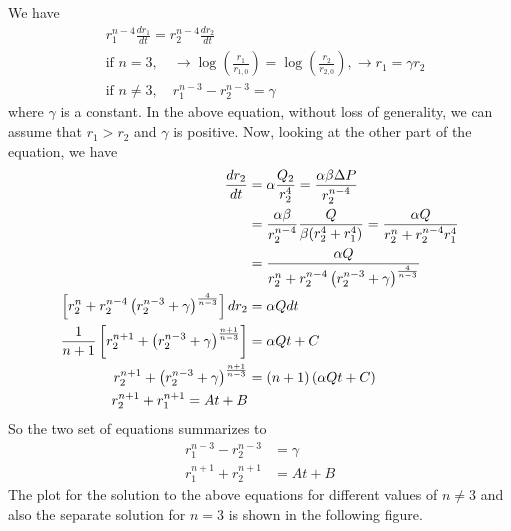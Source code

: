 We have
%
\begin{align}
  &r_{1}^{n-4} \frac{dr_{1}}{dt} = r_2^{n-4}\frac{dr_{2}}{dt}\\
  &\text{if }n=3, \quad \to \log(\frac{r_{1}}{r_{1,0}}) = \log(\frac{r_{2}}{r_{2,0}}), \to r_1 = \gamma r_2 \\
  & \text{if }n\neq 3, \quad r_1^{n-3} - r_2^{n-3} = \gamma
\end{align}
%
where $\gamma$ is a constant. In the above equation, without loss of
generality, we can assume that $r_{1}>r_2$ and $\gamma$ is
positive. Now, looking at the other part of the equation, we have
%
\begin{align}
  \frac{dr_{2}}{dt}  & = \alpha \frac{Q_2}{r^4_{2}} =  \frac{\alpha \beta \Delta P}{r^{n-4}_{2}} \\
                     & = \frac{\alpha \beta }{r^{n-4}_{2}} \frac{Q}{\beta (r_{2}^{4} + r_1^4)} = \frac{\alpha Q}{r^{n}_{2} + r_{2}^{n-4} r_1^{4}} \\
                     & = \frac{\alpha Q}{r^{n}_{2} + r_{2}^{n-4} \left( r_2^{n-3} + \gamma \right)^{\frac{4}{n-3} }}\\
  \left[ r^{n}_{2} + r_{2}^{n-4} \left( r_2^{n-3} + \gamma \right)^{\frac{4}{n-3} }\right] dr_2 & = \alpha Q dt\\
  \frac{1}{n+1} \left[ r_2^{n+1} + \left( r_2^{n-3} + \gamma\right)^{\frac{n+1}{n-3} }\right]  & = \alpha Qt + C\\
  r_2^{n+1} + \left( r_2^{n-3} + \gamma\right)^{\frac{n+1}{n-3} }  & = (n+1)\left( \alpha Qt + C\right) \\
  r_2^{n+1} + r_{1}^{n+1} = At+B
\end{align}
%
So the two set of equations summarizes to
%
\begin{align}
  r_1^{n-3} - r_2^{n-3} &= \gamma \\
  r_1^{n+1} + r_2^{n+1} &= At + B
\end{align}
%
The plot for the solution to the above equations for different values
of $n\neq 3$ and also the separate solution for $n=3$ is shown in the
following figure.  
%

